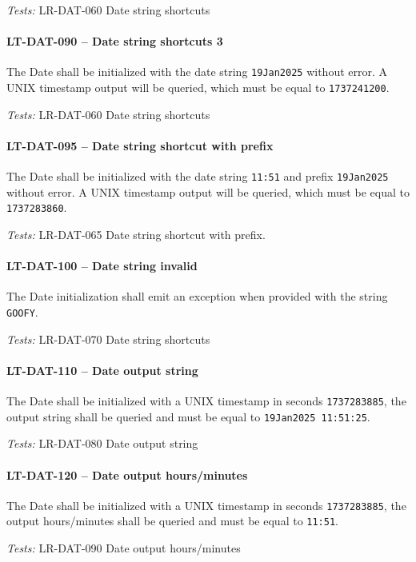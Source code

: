 \textit{Tests: } LR-DAT-060 Date string shortcuts

\paragraph{LT-DAT-090 -- Date string shortcuts 3}
The Date shall be initialized with the date string
\lstinline{19Jan2025} without error.
A UNIX timestamp output will be queried, which must be equal to
\lstinline{1737241200}.

\textit{Tests: } LR-DAT-060 Date string shortcuts

\paragraph{LT-DAT-095 -- Date string shortcut with prefix}
The Date shall be initialized with the date string
\lstinline{11:51} and prefix \lstinline{19Jan2025} without error.
A UNIX timestamp output will be queried, which must be
equal to \lstinline{1737283860}.

\textit{Tests: } LR-DAT-065 Date string shortcut with prefix.

\paragraph{LT-DAT-100 -- Date string invalid}
The Date initialization shall emit an exception when provided
with the string \lstinline{GOOFY}.

\textit{Tests: } LR-DAT-070 Date string shortcuts

\paragraph{LT-DAT-110 -- Date output string}
The Date shall be initialized with a UNIX timestamp in seconds
\lstinline{1737283885}, the output string shall be queried and
must be equal to \lstinline{19Jan2025 11:51:25}.

\textit{Tests: } LR-DAT-080 Date output string

\paragraph{LT-DAT-120 -- Date output hours/minutes}
The Date shall be initialized with a UNIX timestamp in seconds
\lstinline{1737283885}, the output hours/minutes shall be queried
and must be equal to \lstinline{11:51}.

\textit{Tests: } LR-DAT-090 Date output hours/minutes

